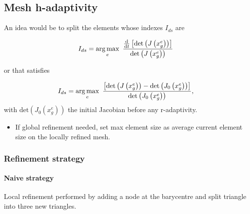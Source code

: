 \subsection{Mesh h-adaptivity}

An idea would be to split the elements whose indexes $I_{ds}$ are

\begin{equation}
	I_{ds} = \operatorname*{arg\,max}_{e}~\frac{\frac{\mathrm{d}}{\mathrm{d}t} \left[ \text{det}\left(J\left(x^e_g\right)\right)\right]}{\text{det}\left(J\left(x^e_g\right)\right)}
\end{equation}

or that satisfies 

\begin{equation}
	I_{ds} = \operatorname*{arg\,max}_{e}~\frac{ \left[ \text{det}\left(J\left(x^e_g\right)\right) - \text{det}\left(J_0\left(x^e_g\right)\right) \right]}{\text{det}\left(J_0\left(x^e_g\right)\right)}, 
\end{equation}
with $\text{det}\left(J_0\left(x^e_g\right)\right)$ the initial Jacobian before any r-adaptivity.
\begin{itemize}
	\item If global refinement needed, set max element size as average current element size on the locally refined mesh.
\end{itemize}


\subsubsection{Refinement strategy}

\paragraph{Naive strategy} Local refinement performed by adding a node at the barycentre and split triangle into three new triangles. 

